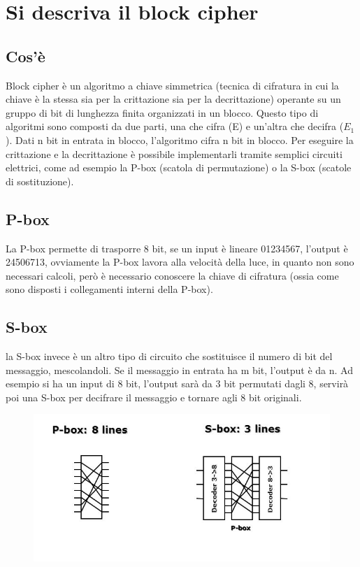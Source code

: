 \section{Si descriva il block cipher}
\subsection{Cos'è}
Block cipher è un algoritmo a chiave simmetrica (tecnica di cifratura in cui la chiave è la stessa sia per la crittazione sia per la decrittazione) operante su un gruppo di bit di lunghezza finita organizzati in un blocco.
Questo tipo di algoritmi sono composti da due parti, una che cifra (E) e un’altra che decifra ($E_1$).
Dati n bit in entrata in blocco, l’algoritmo cifra n bit in blocco.
Per eseguire la crittazione e la decrittazione è possibile implementarli tramite semplici circuiti elettrici, come ad esempio la P-box (scatola di permutazione) o la S-box (scatole di sostituzione).
\subsection{P-box}
La P-box permette di trasporre 8 bit, se un input è lineare 01234567, l’output è 24506713, ovviamente la P-box lavora alla velocità della luce, in quanto non sono necessari calcoli, però è necessario conoscere la chiave di cifratura (ossia come sono disposti i collegamenti interni della P-box).
\subsection{S-box}
la S-box invece è un altro tipo di circuito che sostituisce il numero di bit del messaggio, mescolandoli.
Se il messaggio in entrata ha m bit, l’output è da n. Ad esempio si ha un input di 8 bit, l’output sarà da 3 bit permutati dagli 8, servirà poi una S-box per decifrare il messaggio e tornare agli 8 bit originali. 


\begin{figure}[H]
\centering
\includegraphics[scale=0.6]{res/img/52_P-boxS-box.png}
\end{figure}


